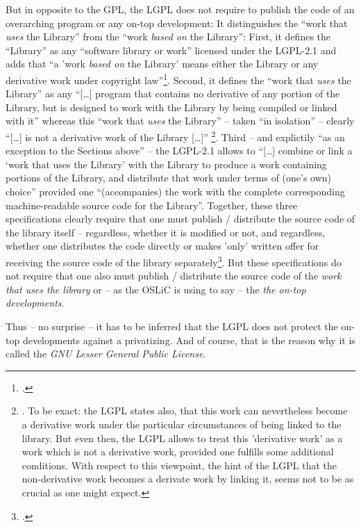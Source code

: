 But in opposite to the GPL, the LGPL does not require to publish the code of an
overarching program or any on-top development: It distinguishes the
\enquote{work that \emph{uses} the Library} from the \enquote{work \emph{based
on} the Library}: First, it defines the \enquote{Library} as any
\enquote{software library or work} licensed under the LGPL-2.1 and adds that
\enquote{a 'work \emph{based on} the Library' means either the Library or any
derivative work under copyright law}\footcite[cf.][\nopage wp. §0, emphasis
ours]{Lgpl21OsiLicense1999a}. Second, it defines the \enquote{work that
\emph{uses} the Library} as any \enquote{[\ldots] program that contains no
derivative of any portion of the Library, but is designed to work with the
Library by being compiled or linked with it} whereas this \enquote{work that
\emph{uses} the Library} -- taken \enquote{in isolation} -- clearly
\enquote{[\ldots] is not a derivative work of the Library [\ldots]}%
\footnote{\cite[cf.][\nopage wp. §5, emphasis ours]{Lgpl21OsiLicense1999a}. To
be exact: the LGPL states also, that this work can nevertheless become a
derivative work under the particular circumstances of being linked to the
library. But even then, the LGPL allows to treat this 'derivative work' as a
work which is not a derivative work, provided one fulfills some additional
conditions. With respect to this viewpoint, the hint of the LGPL that the
non-derivative work becomes a derivate work by linking it, seems not to be as
crucial as one might expect.}. Third -- and explictily \enquote{as an exception
to the Sections above} -- the LGPL-2.1 allows to \enquote{[\ldots] combine or
link a \enquote{work that uses the Library} with the Library to produce a work
containing portions of the Library, and distribute that work under terms of
(one's own) choice} provided one \enquote{(accompanies) the work with the
complete corresponding machine-readable source code for the Library}. Together,
these three specifications clearly require that one must publish / distribute
the source code of the library itself -- regardless, whether it is modified or
not, and regardless, whether one distributes the code directly or makes 'only'
written offer for receiving the source code of the library
separately\footcite[cf.][\nopage wp. §6]{Lgpl21OsiLicense1999a}. But these
specifications do not require that one also must publish / distribute the source
code of the \emph{work that uses the library} or -- as the OSLiC is using to say
-- the \emph{the on-top developments}.

Thus -- no surprise -- it has to be inferred that the LGPL does not protect the
on-top developments against a privatizing. And of course, that is the reason why
it is called the \emph{GNU \emph{Lesser} General Public License}.


